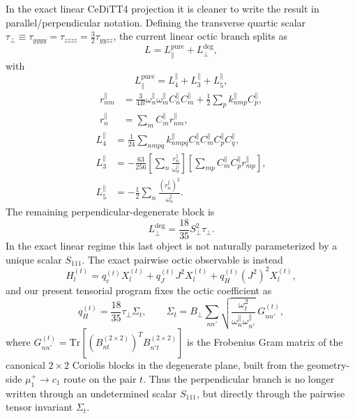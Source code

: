 \documentclass[aip,jcp,reprint,floatfix]{revtex4-2}
\begin{document}
In the exact linear CeDiTT4 projection it is cleaner to write the result in
parallel/perpendicular notation. Defining the transverse quartic scalar
\(\tau_{\perp}\equiv\tau_{yyyy}=\tau_{zzzz}=\tfrac32\tau_{yyzz}\), the current
linear octic branch splits as
\begin{equation}
L = L_{\parallel}^{\mathrm{pure}} + L_{\perp}^{\mathrm{deg}},
\end{equation}
with
\begin{equation}
L_{\parallel}^{\mathrm{pure}}
=
L_{4}^{\parallel}+L_{3}^{\parallel}+L_{5}^{\parallel},
\end{equation}
\begin{align}
r_{nm}^{\parallel} &=
\frac{3}{4B}\omega_n^{\parallel}\omega_m^{\parallel}C_n^{\parallel}C_m^{\parallel}
+\frac12\sum_p k_{nmp}^{\parallel}C_p^{\parallel},\\
r_n^{\parallel} &= \sum_m C_m^{\parallel} r_{nm}^{\parallel},
\end{align}
\begin{align}
L_{4}^{\parallel} &=
\frac{1}{24}\sum_{nmpq}
k_{nmpq}^{\parallel}C_n^{\parallel}C_m^{\parallel}C_p^{\parallel}C_q^{\parallel},\\
L_{3}^{\parallel} &=
-\frac{63}{256}\left[\sum_n\frac{r_n^{\parallel}}{\omega_n^{\parallel}}\right]
\left[\sum_{mp}C_m^{\parallel}C_p^{\parallel}r_{mp}^{\parallel}\right],\\
L_{5}^{\parallel} &=
-\frac12\sum_n\frac{(r_n^{\parallel})^2}{\omega_n^{\parallel}}.
\end{align}
The remaining perpendicular-degenerate block is
\begin{equation}
L_{\perp}^{\mathrm{deg}}=\frac{18}{35}S_{\perp}^2\tau_{\perp}.
\end{equation}
In the exact linear regime this last object is not naturally parameterized by a
unique scalar \(S_{111}\). The exact pairwise octic observable is instead
\begin{equation}
H_l^{(t)} = q_e^{(t)}X_l^{(t)} + q_J^{(t)}J^2X_l^{(t)} + q_H^{(t)}(J^2)^2X_l^{(t)},
\end{equation}
and our present tensorial program fixes the octic coefficient as
\begin{equation}
q_H^{(t)}=\frac{18}{35}\tau_{\perp}\Sigma_t,
\qquad
\Sigma_t=
B_{\perp}\sum_{nn'}
\sqrt{\frac{\omega_t^2}{\omega_n^{\parallel}\omega_{n'}^{\parallel}}}\,
G_{nn'}^{(t)} ,
\label{eq:qh_from_ours}
\end{equation}
where \(G_{nn'}^{(t)}=\mathrm{Tr}\!\left[(B_{nt}^{(2\times2)})^T
B_{n't}^{(2\times2)}\right]\) is the Frobenius Gram matrix of the canonical
\(2\times2\) Coriolis blocks in the degenerate plane, built from the
geometry-side \(\mu_1^+\to c_1\) route on the pair \(t\). Thus the
perpendicular branch is no longer written through an undetermined scalar
\(S_{111}\), but directly through the pairwise tensor invariant \(\Sigma_t\).
\end{document}

